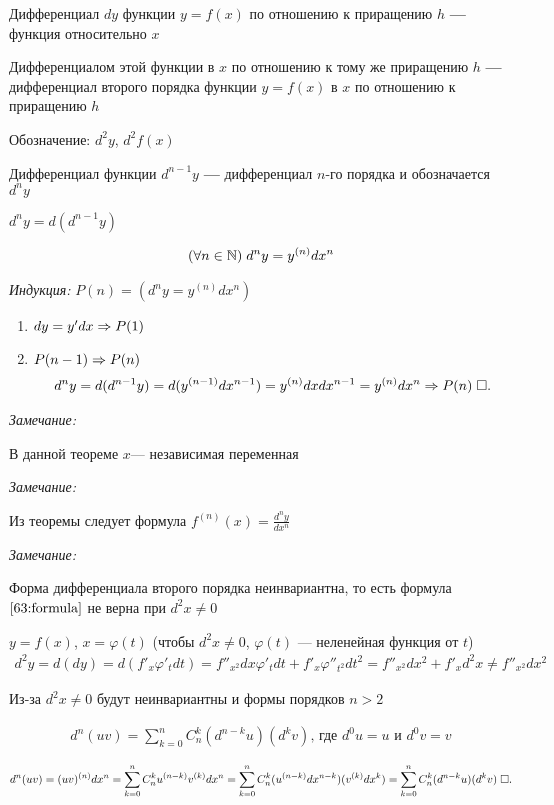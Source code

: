 \documentclass{article}
\begin{document}


Дифференциал $dy$ функции $y=f(x)$ по отношению к приращению $h$ \textbf{---} функция относительно $x$

Дифференциалом этой функции в $x$ по отношению к тому же приращению $h$ \textbf{---} дифференциал второго порядка функции $y=f(x)$ в $x$ по отношению к приращению $h$

Обозначение: $d^{2}y$, $d^{2}f(x)$

Дифференциал функции $d^{n-1}y$ \textbf{---} дифференциал $n$-го порядка и обозначается $d^{n}y$

$d^{n}y=d(d^{n-1}y)$

\theorem
\begin{align}
	(\forall n\in\N)\;d^{n}y=y^{(n)}dx^{n} \label{63:formula}
\end{align}

\proof

{\it Индукция:} $P(n)=(d^{n}y=y^{(n)}dx^{n})$
\begin{enumerate}
	\item{}$dy=y'dx\Rarr P(1)$
	\item{}$P(n-1)\Rarr P(n)$
	\begin{align*}
		d^{n}y=d(d^{n-1}y)=d(y^{(n-1)}dx^{n-1})=y^{(n)}dxdx^{n-1}=y^{(n)}dx^{n}\Rarr P(n)\qed
	\end{align*}
\end{enumerate}

{\it Замечание: }

В данной теореме $x$--- независимая переменная

{\it Замечание: }

Из теоремы следует формула $f^{(n)}(x)=\frac{d^{n}y}{dx^{n}}$

{\it Замечание: }

Форма дифференциала второго порядка неинвариантна, то есть формула $\eqref{63:formula}$ не верна при $d^{2}x\neq 0$

$y=f(x)$, $x=\varphi(t)$ (чтобы $d^{2}x\neq 0$, $\varphi(t)$ --- неленейная функция от $t$)
\begin{align*}
	d^{2}y=d(dy)=d(f'_{x}\varphi'_{t}dt)=f''_{x^{2}}dx\varphi'_{t}dt+f'_{x}\varphi''_{t^{2}}dt^{2}=f''_{x^{2}}dx^{2}+f'_{x}d^{2}x\neq f''_{x^{2}}dx^{2}
\end{align*}

Из-за $d^{2}x\neq 0$ будут неинвариантны и формы порядков $n>2$

\begin{align*}
	d^{n}(uv)=\sum_{k=0}^{n}C_{n}^{k}(d^{n-k}u)(d^{k}v)\text{, где }d^{0}u=u \text{ и } d^{0}v=v
\end{align*}

\proof
\begin{align*}
	d^{n}(uv)=(uv)^{(n)}dx^{n}=\sum_{k=0}^{n}C_{n}^{k}u^{(n-k)}v^{(k)}dx^{n}=\sum_{k=0}^{n}C_{n}^{k}(u^{(n-k)}dx^{n-k})(v^{(k)}dx^{k})=\sum_{k=0}^{n}C_{n}^{k}(d^{n-k}u)(d^{k}v)\qed
\end{align*}
\end{document}
